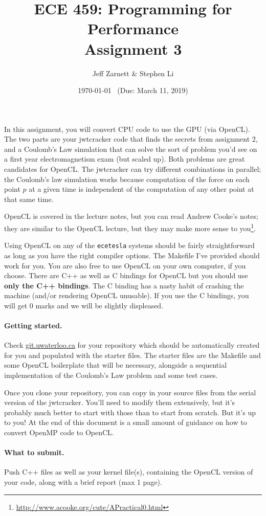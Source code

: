 \documentclass[letterpaper,10pt]{article}
\title{\bf ECE 459: Programming for Performance\\Assignment 3}
\author{Jeff Zarnett \& Stephen Li}
\date{\today ~ (Due: March 11, 2019)}
\begin{document}
\maketitle

In this assignment, you will convert CPU code to use the GPU (via OpenCL). 
The two parts are your jwtcracker code that finds the secrets
from assignment 2, and a Coulomb's Law  simulation that can solve the 
sort of problem you'd see on a first year electromagnetism exam (but scaled up).
Both problems are great candidates for OpenCL. The jwtcracker can try different
combinations in parallel; the Coulomb's law simulation works because computation
 of the force on each point $p$ at a given time is
independent of the computation of any other point at that same time. 

OpenCL is covered in the lecture notes, but you can read Andrew Cooke's notes; they 
are similar to the OpenCL lecture, but they may make more sense to you\footnote{\url{http://www.acooke.org/cute/APractical0.html}}.

Using OpenCL on any of the \texttt{ecetesla} systems
 should be fairly straightforward as long as
you have the right compiler options. The Makefile I've provided
should work for you. You are also free to use OpenCL on your own
computer, if you choose. There are C++ as well as C bindings for OpenCL but you 
should use \textbf{only the C++ bindings}. The C binding has a nasty habit of 
crashing the machine (and/or rendering OpenCL unusable). If you use the C bindings, 
you will get 0 marks and we will be slightly displeased.

\paragraph{Getting started.} 
Check \url{git.uwaterloo.ca} for your repository which should 
be automatically created for you and populated with the starter files. The starter 
files are the Makefile and some OpenCL boilerplate that will be necessary, alongside 
a sequential implementation of the Coulomb's Law problem and some test cases.


Once you clone your repository, you can copy in your source files from 
the serial version of the jwtcracker.
You'll need to 
modify them extensively, but it's probably much better to start with those than to 
start from scratch. But it's up to you! At the end of this document is a small amount
of guidance on how to convert OpenMP code to OpenCL.

\paragraph{What to submit.} Push C++ files as well as your kernel file(s), containing 
the OpenCL version of your code, along with a brief report (max 1 page).
\end{document}
